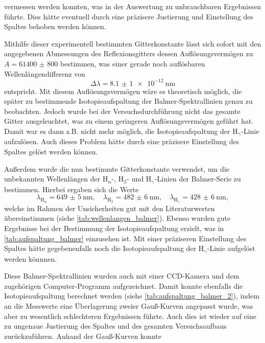 vermessen werden konnten, was in der Auswertung zu unbrauchbaren Ergebnissen führte. Dies hätte eventuell durch
eine präzisere Justierung und Einstellung des Spaltes behoben werden können.\par
Mithilfe dieser experimentell bestimmten Gitterkonstante lässt sich sofort mit den angegebenen Abmessungen des Reflexionsgitters
dessen Auflösungsvermögen zu $A = \num{61400(800)}$ bestimmen, was einer gerade noch auflösbaren Wellenlängendifferenz von
\begin{equation*}
    \Delta \lambda = \SI{8,1(1)e-12}{\nano \meter}
\end{equation*} entspricht. Mit diesem Auflösungsvermögen wäre es theoretisch möglich, die später zu bestimmende Isotopieaufspaltung
der Balmer-Spektrallinien genau zu beobachten. Jedoch wurde bei der Versuchsdurchführung nicht das gesamte Gitter ausgeleuchtet,
was zu einem geringeren Auflösungsvermögen geführt hat. Damit war es dann z.B. nicht mehr möglich, die Isotopieaufspaltung
der $\mathrm{H_{\gamma}}$-Linie aufzulösen. Auch dieses Problem hätte durch eine präzisere Einstellung des Spaltes gelöst werden können.\par
Außerdem wurde die nun bestimmte Gitterkonstante verwendet, um die unbekannten Wellenlängen der $\mathrm{H_{\alpha}}$-, $\mathrm{H_{\beta}}$- und
$\mathrm{H_{\gamma}}$-Linien der Balmer-Serie zu bestimmen. Hierbei ergaben sich die Werte
\begin{equation*}
    \lambda_{\mathrm{H_{\alpha}}} = \SI{649(5)}{\nano \meter}, \quad \lambda_{\mathrm{H_{\beta}}} = \SI{482(6)}{\nano \meter}, \quad \lambda_{\mathrm{H_{\gamma}}} = \SI{428(6)}{\nano \meter},
\end{equation*} welche im Rahmen der Unsicherheiten gut mit den Literaturwerten übereinstimmen (siehe \cref{tab:wellenlangen_balmer}).
Ebenso wurden gute Ergebnisse bei der Bestimmung der Isotopieaufspaltung erzielt, was in \cref{tab:aufspaltung_balmer} einzusehen ist. Mit einer
präziseren Einstellung des Spaltes hätte gegebenenfalls noch die Isotopieaufspaltung der $\mathrm{H_{\gamma}}$-Linie aufgelöst werden könnnen.\par
Diese Balmer-Spektrallinien wurden auch mit einer CCD-Kamera und dem zugehörigen Computer-Programm aufgezeichnet. Damit konnte ebenfalls
die Isotopieaufspaltung berechnet werden (siehe \cref{tab:aufspaltung_balmer_2}), indem an die Messwerte eine Überlagerung
zweier Gauß-Kurven angepasst wurde, was aber zu wesentlich schlechteren Ergebnissen führte. Auch
dies ist wieder auf eine zu ungenaue Justierung des Spaltes und des gesamten Versuchsaufbaus zurückzuführen. Anhand der Gauß-Kurven konnte
